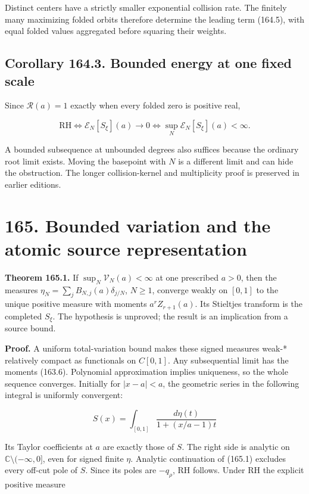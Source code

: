 \documentclass[
  11pt,
]{book}
\renewenvironment{quote}
  {\begin{tcolorbox}[
      enhanced,
      breakable,
      colback=tncream,
      colframe=tnrust,
      boxrule=0.8pt,
      arc=1.5pt,
      left=7pt,
      right=7pt,
      top=6pt,
      bottom=6pt]}
  {\end{tcolorbox}}
\begin{document}
Distinct centers have a strictly smaller exponential collision rate. The
finitely many maximizing folded orbits therefore determine the leading
term (164.5), with equal folded values aggregated before squaring their
weights.

\subsection{Corollary 164.3. Bounded energy at one fixed
scale}\label{corollary-164.3.-bounded-energy-at-one-fixed-scale}

Since \(\mathcal R(a)=1\) exactly when every folded zero is positive
real,

\[
\boxed{\mathrm{RH}\iff
\mathscr E_N[S_\xi](a)\to0
\iff\sup_N\mathscr E_N[S_\xi](a)<\infty.}
\tag{164.13}
\]

A bounded subsequence at unbounded degrees also suffices because the
ordinary root limit exists. Moving the basepoint with \(N\) is a
different limit and can hide the obstruction. The longer
collision-kernel and multiplicity proof is preserved in earlier
editions.

\section{165. Bounded variation and the atomic source
representation}\label{bounded-variation-and-the-atomic-source-representation}

\begin{quote}
\textbf{Theorem 165.1.} If \(\sup_N\mathcal V_N(a)<\infty\) at one
prescribed \(a>0\), then the measures
\(\eta_N=\sum_jB_{N,j}(a)\delta_{j/N}\), \(N\ge1\), converge weakly on
\([0,1]\) to the unique positive measure with moments \(a^rZ_{r+1}(a)\).
Its Stieltjes transform is the completed \(S_\xi\). The hypothesis is
unproved; the result is an implication from a source bound.
\end{quote}

\textbf{Proof.} A uniform total-variation bound makes these signed
measures weak-* relatively compact as functionals on \(C[0,1]\). Any
subsequential limit has the moments (163.6). Polynomial approximation
implies uniqueness, so the whole sequence converges. Initially for
\(|x-a|<a\), the geometric series in the following integral is uniformly
convergent:

\[
S(x)=\int_{[0,1]}\frac{d\eta(t)}{1+(x/a-1)t}
\tag{165.1}
\]

Its Taylor coefficients at \(a\) are exactly those of \(S\). The right
side is analytic on \(\mathbb C\setminus(-\infty,0]\), even for signed
finite \(\eta\). Analytic continuation of (165.1) excludes every off-cut
pole of \(S\). Since its poles are \(-q_\rho\), RH follows. Under RH the
explicit positive measure
\end{document}
